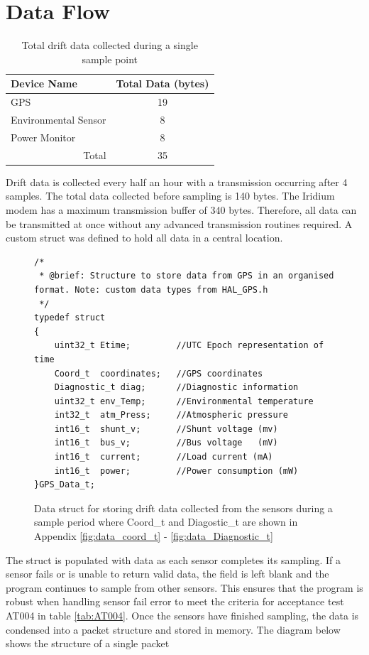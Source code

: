 \section{Data Flow}
\begin{table}[H]
    \caption{Total drift data collected during a single sample point}
    \centering
    \begin{tabular}{|l|c|}
      \hline
      \textbf{Device Name}   &  \textbf{Total Data (bytes)}\\
      \hline
       GPS  & 19 \\
       Environmental Sensor & 8 \\
       Power Monitor & 8\\
       \hline
       \multicolumn{1}{r}{Total} & \multicolumn{1}{c}{35}\\
       \cline{2-2}
       \cline{2-2}
    \end{tabular}

    \label{tab:total_data}
\end{table}

Drift data is collected every half an hour with a transmission occurring after 4 samples. The total data collected before sampling is 140 bytes. The Iridium modem has a maximum transmission buffer of 340 bytes. Therefore, all data can be transmitted at once without any advanced transmission routines required. A custom struct was defined to hold all data in a central location.

\begin{figure}[H]
    \centering
\begin{lstlisting}
/*
 * @brief: Structure to store data from GPS in an organised format. Note: custom data types from HAL_GPS.h
 */
typedef struct
{
	uint32_t Etime;			//UTC Epoch representation of time
	Coord_t  coordinates;	//GPS coordinates
	Diagnostic_t diag;		//Diagnostic information
	uint32_t env_Temp;		//Environmental temperature
	int32_t  atm_Press;		//Atmospheric pressure
	int16_t  shunt_v;       //Shunt voltage (mv)
	int16_t  bus_v;			//Bus voltage   (mV)
	int16_t  current;       //Load current (mA)
	int16_t  power;			//Power consumption (mW)
}GPS_Data_t;
\end{lstlisting}
    \caption{Data struct for storing drift data collected from the sensors during a sample period where Coord\_t and Diagostic\_t are shown in Appendix \ref{fig:data_coord_t} - \ref{fig:data_Diagnostic_t}} 
    \label{fig:data_drift_struct}
\end{figure}

The struct is populated with data as each sensor completes its sampling. If a sensor fails or is unable to return valid data, the field is left blank and the program continues to sample from other sensors. This ensures that the program is robust when handling sensor fail error to meet the criteria for acceptance test AT004 in table \ref{tab:AT004}. Once the sensors have finished sampling, the data is condensed into a packet structure and stored in memory. The diagram below shows the structure of a single packet

